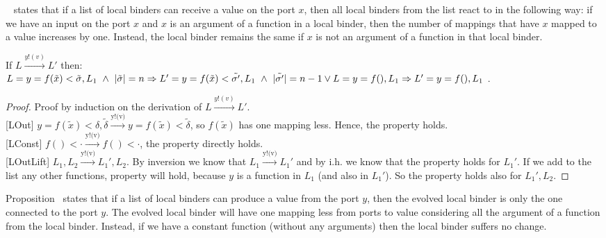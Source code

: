  ~ states that if a list of local binders can receive a value on the port $x$, then all local binders from the list react to in the following way: if we have an input on the port $x$ and $x$ is an argument of a function in a local binder, then the number of mappings that have $x$ mapped to a value increases by one. Instead, the local binder remains the same if $x$ is not an argument of a function in that local binder. 
 
 
 
 
 
 
 
 \begin{proposition} If $L \xrightarrow{y!(v)} L'$ then: \\
 $L=y=f(\tilde{x})<\tilde{\delta},L_1 \ \wedge \ |\tilde{\delta}|=n \Rightarrow L'=y=f(\tilde{x})<\tilde{\delta'},L_1 \ \wedge  \ |\tilde{\delta'}|=n-1 \lor\\
 L=y=f(),L_1\Rightarrow L'=y=f(),L_1 $  .
 
 \end{proposition}
 
 \begin{proof} Proof  by induction on the derivation of $L \xrightarrow{y!(v)} L'$.\\
 
 [LOut] $ y=f(\tilde{x})<\delta, \tilde{\delta}\xrightarrow{\text{y!(v)}}y=f(\tilde{x})<\tilde{\delta}$, so $f(\tilde{x})$ has one mapping less. Hence, the property holds.\\
 
[LConst] $f()<\cdot \xrightarrow{\text{y!(v)}} f()<\cdot$, the property directly holds.\\
 
 
[LOutLift] $L_1,L_2\xrightarrow{\text{y!(v)}}L_1',L_2$. By inversion we know that $L_1 \xrightarrow{\text{y!(v)}} L_1'$ and  by i.h. we know that the property holds for $L_1'$. If we add to the list any other functions, property will hold, because $y$ is a function in $L_1$ (and also in $ L_1'$). So the property holds also for $L_1',L_2$.
 
 \end{proof}
 

   Proposition~ states that if a list of local binders can produce a value from the port $y$, then the evolved local binder is only the one connected to the port $y$. The evolved local binder will have one mapping less from ports to value considering all the argument of a function from the local binder. Instead, if we have a constant function (without any arguments) then the local binder suffers no change.
 

